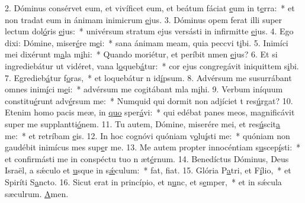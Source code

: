 2. Dóminus consérvet eum, et vivíficet eum, et beátum fáciat \uline{e}um in t\uline{e}rra:~* et non tradat eum in ánimam inimicrum \uline{e}jus.
3. Dóminus opem ferat illi super lectum dol\uline{ó}ris \uline{e}jus:~* univérsum stratum ejus versásti in infirmitte \uline{e}jus.
4. Ego dixi: Dómine, miser\uline{é}re m\uline{e}i:~* sana ánimam meam, quia peccvi t\uline{i}bi.
5. Inimíci mei dixérunt m\uline{a}la m\uline{i}hi:~* Quando moriétur, et períbit nmen \uline{e}jus?
6. Et si ingrediebátur ut vidéret, vana l\uline{o}queb\uline{á}tur:~* cor ejus congregávit iniquittem s\uline{i}bi.
7. Egredieb\uline{á}tur f\uline{o}ras,~* et loquebátur n id\uline{í}psum.
8. Advérsum me susurrábant omnes inim\uline{í}ci m\uline{e}i:~* advérsum me cogitábant mla m\uline{i}hi.
9. Verbum iníquum constitu\uline{é}runt adv\uline{é}rsum me:~* Numquid qui dormit non adjíciet t res\uline{ú}rgat?
10. Etenim homo pacis meæ, in \uline{quo} sper\uline{á}vi:~* qui edébat panes meos, magnificávit super me supplantti\uline{ó}nem.
11. Tu autem, Dómine, miserére mei, et res\uline{ú}scit\uline{a} me:~* et retríbam \uline{e}is.
12. In hoc cognóvi quóniam v\uline{o}lu\uline{í}sti me:~* quóniam non gaudébit inimícus mes sup\uline{e}r me.
13. Me autem propter innocéntiam s\uline{u}scep\uline{í}sti:~* et confirmásti me in conspéctu tuo n æt\uline{é}rnum.
14. Benedíctus Dóminus, Deus Israël, a sǽculo et \uline{u}sque in s\uline{ǽ}culum:~* fat, f\uline{i}at.
15. Glória P\uline{a}tri, et F\uline{í}lio,~* et Spiríti S\uline{a}ncto.
16. Sicut erat in princípio, et n\uline{u}nc, et s\uline{e}mper,~* et in sǽcula sæculrum. \uline{A}men.
